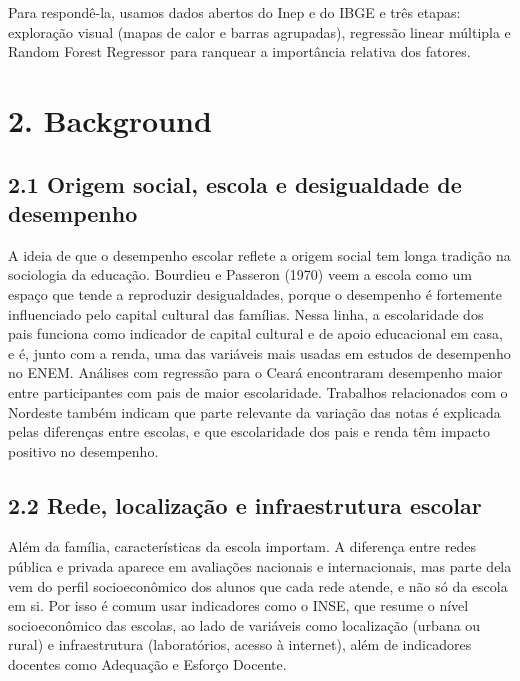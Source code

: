 \documentclass[twocolumn,10pt,a4paper]{article}
\begin{document}
Para respondê-la, usamos dados abertos do Inep e do IBGE e três etapas: exploração visual (mapas de calor e barras agrupadas), regressão linear múltipla e Random Forest Regressor para ranquear a importância relativa dos fatores.

\section*{2. Background}

\subsection*{2.1 Origem social, escola e desigualdade de desempenho}

A ideia de que o desempenho escolar reflete a origem social tem longa tradição na sociologia da educação. Bourdieu e Passeron (1970) veem a escola como um espaço que tende a reproduzir desigualdades, porque o desempenho é fortemente influenciado pelo capital cultural das famílias. Nessa linha, a escolaridade dos pais funciona como indicador de capital cultural e de apoio educacional em casa, e é, junto com a renda, uma das variáveis mais usadas em estudos de desempenho no ENEM. Análises com regressão para o Ceará encontraram desempenho maior entre participantes com pais de maior escolaridade. Trabalhos relacionados com o Nordeste também indicam que parte relevante da variação das notas é explicada pelas diferenças entre escolas, e que escolaridade dos pais e renda têm impacto positivo no desempenho.

\subsection*{2.2 Rede, localização e infraestrutura escolar}

Além da família, características da escola importam. A diferença entre redes pública e privada aparece em avaliações nacionais e internacionais, mas parte dela vem do perfil socioeconômico dos alunos que cada rede atende, e não só da escola em si. Por isso é comum usar indicadores como o INSE, que resume o nível socioeconômico das escolas, ao lado de variáveis como localização (urbana ou rural) e infraestrutura (laboratórios, acesso à internet), além de indicadores docentes como Adequação e Esforço Docente.
\end{document}

